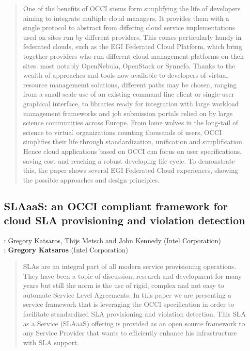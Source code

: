 \documentclass[10pt,a4paper]{article}
\begin{document}
\begin{quote}
	One of the benefits of OCCI stems form simplifying the life of developers aiming to integrate multiple cloud
	managers. It provides them with a single protocol to abstract from differing cloud service implementations
	used on sites run by different providers. This comes perticularly handy in federated clouds, such as the EGI
	Federated Cloud Platform, which bring together providers who run different cloud management platforms on
	their sites: most notably OpenNebula, OpenStack or Synnefo. Thanks to the wealth of approaches and tools
	now available to developers of virtual resource managememt solutions, different paths may be chosen,
	ranging from a small-scale use of an existing command line client or single-user graphical interface, to
	libraries ready for integration with large workload management frameworks and job submission portals relied
	on by large science communities across Europe. From lome wolves in the long-tail of science to virtual
	organizations counting thousands of users, OCCI simplifies their life through standardization, unification and
	simplification. Hence cloud applications based on OCCI can focus on user specifications, saving cost and
	reaching a robust developing life cycle. To demonstrate this, the paper shows several EGI Federated Cloud
	experiences, showing the possible approaches and design principles.
\end{quote}

\subsection*{SLAaaS: an OCCI compliant framework for cloud SLA provisioning and violation detection \cite{kat16a}}

: Gregory Katsaros, Thijs Metsch and John Kennedy (Intel Corporation)\\
: {\bf Gregory Katsaros} (Intel Corporation)

\begin{quote}
	SLAs are an integral part of all modern service provisioning operations. They have been a topic of discussion, research and
	development for many years but still the norm is the use of rigid, complex and not easy to automate Service Level Agreements.
	In this paper we are presenting a service framework that is leveraging the OCCI specification in order to facilitate standardized
	SLA provisioning and violation detection. This SLA as a Service (SLAaaS) offering is provided as an open source framework to
	any Service Provider that wants to efficiently enhance his infrastructure with SLA support.
\end{quote}
\end{document}
